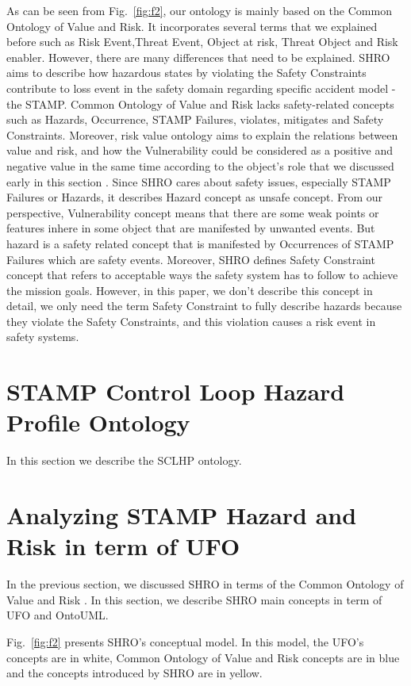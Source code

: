 \documentclass[sw]{iosart2x}
\newcommand{\term}[1]{\textnormal{\textsf{#1}}}
\begin{document}
As can be seen from Fig.~\ref{fig:f2}, our ontology is mainly based on the Common Ontology of Value and Risk. It incorporates several terms that we explained before such as \term{Risk Event},\term{Threat Event}, \term{Object at risk}, \term{Threat Object} and \term{Risk enabler}. However, there are many differences that need to be explained. SHRO aims to describe how hazardous states by violating the \term{Safety Constraints} contribute to loss event in the safety domain regarding specific accident model - the STAMP. Common Ontology of Value and Risk lacks safety-related concepts such as \term{Hazards}, \term{Occurrence}, \term{STAMP Failures}, \term{violates}, \term{mitigates} and \term{Safety Constraints}. Moreover, risk value ontology aims to explain the relations between value and risk, and how the \term {Vulnerability} could be considered as a positive and negative value in the same time according to the object's role that we discussed early in this section \cite{unknown}. Since SHRO cares about safety issues, especially \term{STAMP Failures} or \term{Hazards}, it describes \term{Hazard} concept as unsafe concept. From our perspective, \term{Vulnerability} concept means that there are some weak points or features inhere in some object that are manifested by unwanted events. But hazard is a safety related concept that is manifested by \term{Occurrences} of \term{STAMP Failures} which are safety events.
Moreover, SHRO defines \term{Safety Constraint} concept that refers to acceptable ways the safety system has to follow to achieve the mission goals. However, in this paper, we don't describe this concept in detail, we only need the term \term{Safety Constraint} to fully describe hazards because they violate the \term{Safety Constraints}, and this violation causes a risk event in safety systems.
\section{STAMP Control Loop Hazard Profile Ontology}
\label{sec:sclhp}
In this section we describe the SCLHP ontology.

\section{Analyzing STAMP Hazard and Risk in term of UFO}
In the previous section, we discussed SHRO in terms of the Common Ontology of Value and Risk \cite{unknown}. In this section, we describe SHRO main concepts in term of UFO and OntoUML.

Fig.~\ref{fig:f2} presents SHRO's conceptual model. In this model, the UFO's concepts are in white, Common Ontology of Value and Risk concepts are in blue and the concepts introduced by SHRO are in yellow. 
\end{document}
